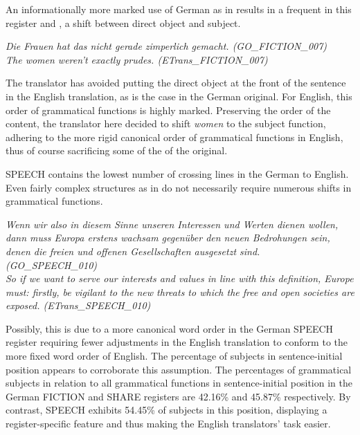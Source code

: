 \documentclass[output=paper]{LSP/langsci}
\begin{document}
An informationally more marked use of German as in  results in a frequent  in this register and , a shift between direct object and subject. 


\ea \label{ex:culo:25}
  \ea 
\textit{Die Frauen hat das nicht gerade zimperlich gemacht. \textup{(GO\_FICTION\_007)}}\\
   \ex \textit{The women weren't exactly prudes. \textup{(ETrans\_FICTION\_007)}}
   \z
\z

The translator has avoided putting the direct object at the front of the sentence in the English translation, as is the case in the German original. For English, this order of grammatical functions is highly marked. Preserving the order of the content, the translator here decided to shift \textit{women} to the subject function, adhering to the more rigid canonical order of grammatical functions in English, thus of course sacrificing some of the  of the original.

SPEECH contains the lowest number of crossing lines in the  German to English. Even fairly complex structures as in  do not necessarily require numerous shifts in grammatical functions.


\ea \label{ex:culo:26}
   \ea
\textit{Wenn wir also in diesem Sinne unseren Interessen und Werten dienen wollen, dann   muss Europa erstens wachsam gegenüber den neuen Bedrohungen sein, denen die   freien und offenen Gesellschaften ausgesetzt sind. \textup{(GO\_SPEECH\_010)}}\\
   \ex 
   \textit{So if we want to serve our interests and values in line with this definition, Europe must:   firstly, be vigilant to the new threats to which the free and open societies are exposed.   \textup{(ETrans\_SPEECH\_010)}}
   \z
\z

Possibly, this is due to a more canonical word order in the German SPEECH register requiring fewer adjustments in the English translation to conform to the more fixed word order of English. The percentage of subjects in sentence-initial position appears to corroborate this assumption. The percentages of grammatical subjects in relation to all grammatical functions in sentence-initial position in the German FICTION and SHARE registers are 42.16\% and 45.87\% respectively. By contrast, SPEECH exhibits 54.45\% of subjects in this position, displaying a register-specific feature and thus making the English translators' task easier.
\end{document}
